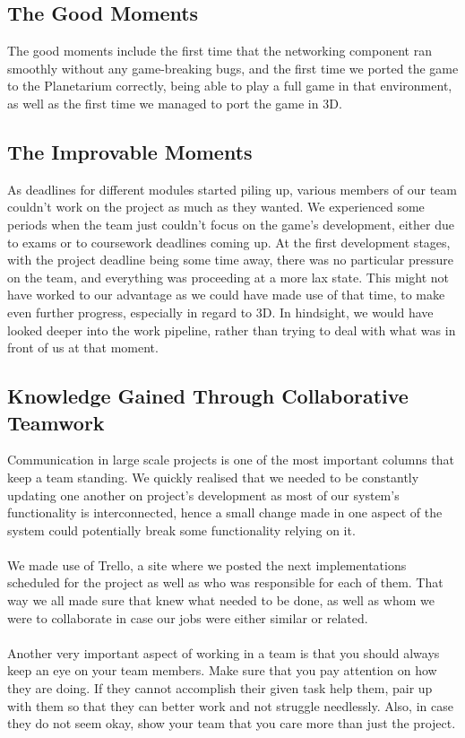 \documentclass[11pt,a4paper]{article}
\begin{document}
         
 \subsection{The Good Moments}
        The good moments include the first time that the networking component ran smoothly without any game-breaking bugs, and the first time we ported the game to the Planetarium correctly, being able to play a full game in that environment, as well as the first time we managed to port the game in 3D.

        \subsection{The Improvable Moments}
        As deadlines for different modules started piling up, various members of our team couldn't work on the project as much as they wanted. We experienced some periods when the team just couldn't focus on the game's development, either due to exams or to coursework deadlines coming up.
        At the first development stages, with the project deadline being some time away, there was no particular pressure on the team, and everything was proceeding at a more lax state. This might not have worked to our advantage as we could have made use of that time, to make even further progress, especially in regard to 3D. In hindsight, we would have looked deeper into the work pipeline, rather than trying to deal with what was in front of us at that moment.  


        \subsection{Knowledge Gained Through Collaborative Teamwork}
        Communication in large scale projects is one of the most important columns that keep a team standing. We quickly realised that we needed to be constantly updating one another on project's development as most of our system's functionality is interconnected, hence a small change made in one aspect of the system could potentially break some functionality relying on it.\\\\
        We made use of Trello, a site where we posted the next implementations scheduled for the project as well as who was responsible for each of them. That way we all made sure that knew what needed to be done, as well as whom we were to collaborate in case our jobs were either similar or related.\\\\
        Another very important aspect of working in a team is that you should always keep an eye on your team members. Make sure that you pay attention on how they are doing. If they cannot accomplish their given task help them, pair up with them so that they can better work and not struggle needlessly. Also, in case they do not seem okay, show your team that you care more than just the project.
         
\end{document}
